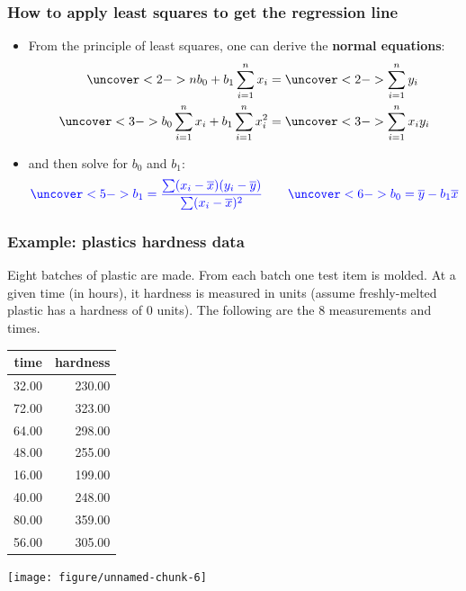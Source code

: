 \documentclass[handout]{beamer}\usepackage{graphicx, color}
\newenvironment{knitrout}{}{} %
\providecommand{\ov}[1]{\overline{#1}}
\numberwithin{equation}{section}
\begin{document}
\begin{frame}
\frametitle{How to apply least squares to get the regression line}
\begin{itemize}
\pause \item From the principle of least squares, one can derive the {\bf normal equations}:
\begin{align*}
\uncover<2->{n b_0 + b_1 \sum_{i = 1}^n x_i} &= \uncover<2->{\sum_{i = 1}^n y_i} \\
\uncover<3->{b_0 \sum_{i = 1}^n x_i + b_1 \sum_{i = 1}^n x_i^2} &= \uncover<3->{\sum_{i = 1}^n x_i y_i}
\end{align*}
\pause \pause \item and then solve for $b_0$ and $b_1$:
\begin{align*}
\color{blue} \uncover<5->{b_1 = \frac{\sum(x_i - \ov{x})(y_i - \ov{y})}{\sum(x_i - \ov{x})^2}} \qquad \uncover<6->{b_0 = \ov{y}- b_1 \ov{x}}
\end{align*}
\end{itemize}
\end{frame}

\begin{frame}[fragile]
\frametitle{Example: plastics hardness data} \small
Eight batches of plastic are made. From each batch one test item is molded. At a given time (in hours), it hardness is measured in units (assume freshly-melted plastic has a hardness of 0 units). The following are the 8 measurements and times.

\begin{minipage}[b]{0.47\linewidth} 
\begin{table}[ht]
\centering
\begin{tabular}{rr}
 time & hardness \\ 
  \hline
32.00 & 230.00 \\ 
  72.00 & 323.00 \\ 
  64.00 & 298.00 \\ 
  48.00 & 255.00 \\ 
  16.00 & 199.00 \\ 
  40.00 & 248.00 \\ 
  80.00 & 359.00 \\ 
  56.00 & 305.00 \\ 
  \end{tabular}
\end{table}


\end{minipage}
\begin{minipage}[b]{0.47\linewidth} 
\begin{knitrout}
\color{fgcolor}
\texttt{[image: figure/unnamed-chunk-6]} 

\end{knitrout}

\end{minipage}

\end{frame}
\end{document}
